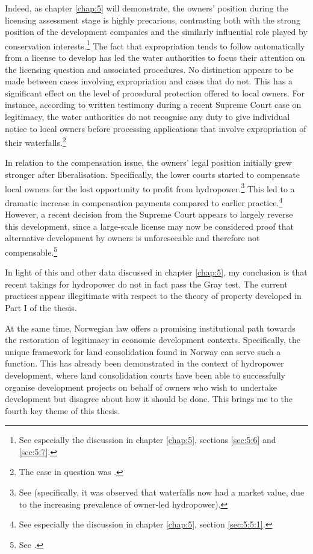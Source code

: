 Indeed, as chapter \ref{chap:5} will demonstrate, the owners' position during the licensing assessment stage is highly precarious, contrasting both with the strong position of the development companies and the similarly influential role played by conservation interests.\footnote{See especially the discussion in chapter \ref{chap:5}, sections \ref{sec:5:6} and \ref{sec:5:7}.} The fact that expropriation tends to follow automatically from a license to develop has led the water authorities to focus their attention on the licensing question and associated procedures. No distinction appears to be made between cases involving expropriation and cases that do not. This has a significant effect on the level of procedural protection offered to local owners. For instance, according to written testimony during a recent Supreme Court case on legitimacy, the water authorities do not recognise any duty to give individual notice to local owners before processing applications that involve expropriation of their waterfalls.\footnote{The case in question was \cite{jorpeland11}.}

In relation to the compensation issue, the owners' legal position initially grew stronger after liberalisation. Specifically, the lower courts started to compensate local owners for the lost opportunity to profit from hydropower.\footnote{See \cite{uleberg08} (specifically, it was observed that waterfalls now had a market value, due to the increasing prevalence of owner-led hydropower).} This led to a dramatic increase in compensation payments compared to earlier practice.\footnote{See especially the discussion in chapter \ref{chap:5}, section \ref{sec:5:5:1}.} However, a recent decision from the Supreme Court appears to largely reverse this development, since a large-scale license may now be considered proof that alternative development by owners is unforeseeable and therefore not compensable.\footnote{See \cite{otra13}.} 

In light of this and other data discussed in chapter \ref{chap:5}, my conclusion is that recent takings for hydropower do not in fact pass the Gray test. The current practices appear illegitimate with respect to the theory of property developed in Part I of the thesis.

At the same time, Norwegian law offers a promising institutional path towards the restoration of legitimacy in economic development contexts. Specifically, the unique framework for land consolidation found in Norway can serve such a function. This has already been demonstrated in the context of hydropower development, where land consolidation courts have been able to successfully organise development projects on behalf of owners who wish to undertake development but disagree about how it should be done. This brings me to the fourth key theme of this thesis.

